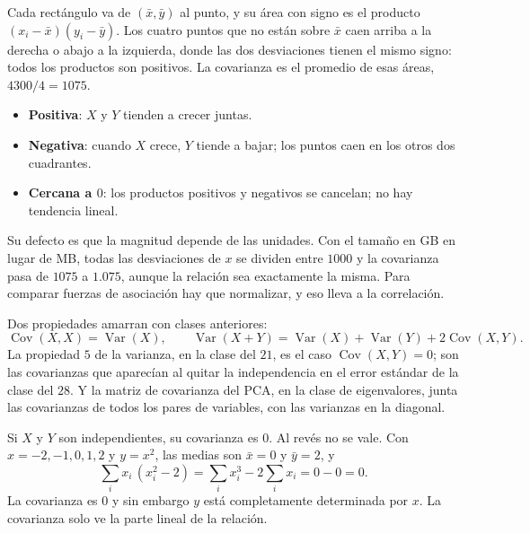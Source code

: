 \documentclass[11pt,letterpaper]{article}
\begin{document}
Cada rectángulo va de $(\bar{x}, \bar{y})$ al punto, y su área con
signo es el producto $(x_i - \bar{x})(y_i - \bar{y})$. Los cuatro
puntos que no están sobre $\bar{x}$ caen arriba a la derecha o abajo a
la izquierda, donde las dos desviaciones tienen el mismo signo: todos
los productos son positivos. La covarianza es el promedio de esas
áreas, $4300 / 4 = 1075$.

\begin{itemize}[itemsep=0.3em]
    \item \textbf{Positiva}: $X$ y $Y$ tienden a crecer juntas.
    \item \textbf{Negativa}: cuando $X$ crece, $Y$ tiende a bajar; los
          puntos caen en los otros dos cuadrantes.
    \item \textbf{Cercana a $0$}: los productos positivos y negativos se
          cancelan; no hay tendencia lineal.
\end{itemize}

Su defecto es que la magnitud depende de las unidades. Con el tamaño en
GB en lugar de MB, todas las desviaciones de $x$ se dividen entre
$1000$ y la covarianza pasa de $1075$ a $1.075$, aunque la relación sea
exactamente la misma. Para comparar fuerzas de asociación hay que
normalizar, y eso lleva a la correlación.

Dos propiedades amarran con clases anteriores:
\[
    \operatorname{Cov}(X, X) = \operatorname{Var}(X) ,
    \qquad
    \operatorname{Var}(X + Y) = \operatorname{Var}(X)
        + \operatorname{Var}(Y) + 2 \operatorname{Cov}(X, Y) .
\]
La propiedad $5$ de la varianza, en la clase del $21$, es el caso
$\operatorname{Cov}(X, Y) = 0$; son las covarianzas que aparecían al
quitar la independencia en el error estándar de la clase del $28$. Y la
matriz de covarianza del PCA, en la clase de eigenvalores, junta las
covarianzas de todos los pares de variables, con las varianzas en la
diagonal.

\begin{ojo}
    Si $X$ y $Y$ son independientes, su covarianza es $0$. Al revés no
    se vale. Con $x = -2, -1, 0, 1, 2$ y $y = x^2$, las medias son
    $\bar{x} = 0$ y $\bar{y} = 2$, y
    \[
        \sum_{i} x_i\,(x_i^2 - 2) = \sum_i x_i^3 - 2 \sum_i x_i
        = 0 - 0 = 0 .
    \]
    La covarianza es $0$ y sin embargo $y$ está completamente
    determinada por $x$. La covarianza solo ve la parte lineal de la
    relación.
\end{ojo}

\end{document}
